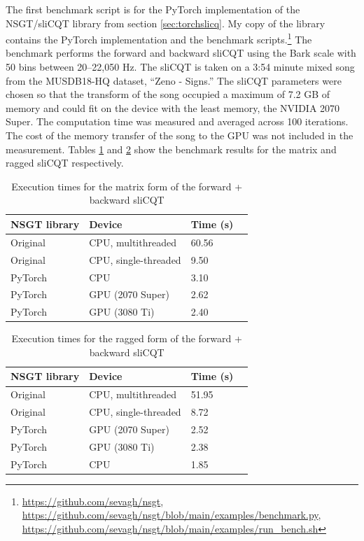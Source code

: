 \documentclass[report.tex]{subfiles}
\begin{document}
The first benchmark script is for the PyTorch implementation of the NSGT/sliCQT library from section \ref{sec:torchslicq}. My copy of the library contains the PyTorch implementation and the benchmark scripts.\footnote{\url{https://github.com/sevagh/nsgt}, \url{https://github.com/sevagh/nsgt/blob/main/examples/benchmark.py}, \url{https://github.com/sevagh/nsgt/blob/main/examples/run_bench.sh}} The benchmark performs the forward and backward sliCQT using the Bark scale with 50 bins between 20--22,050 Hz. The sliCQT is taken on a 3:54 minute mixed song from the MUSDB18-HQ dataset, ``Zeno - Signs.'' The sliCQT parameters were chosen so that the transform of the song occupied a maximum of 7.2 GB of memory and could fit on the device with the least memory, the NVIDIA 2070 Super. The computation time was measured and averaged across 100 iterations. The cost of the memory transfer of the song to the GPU was not included in the measurement. Tables \ref{table:nsgttorchresultsmatrix} and \ref{table:nsgttorchresultsragged} show the benchmark results for the matrix and ragged sliCQT respectively.

\begin{table}[ht]
	\centering
	\caption{Execution times for the matrix form of the forward + backward sliCQT}
	\label{table:nsgttorchresultsmatrix}
	\begin{tabular}{ |l|l|l|l| }
	 \hline
		NSGT library & Device & Time (s) \\
	 \hline
	 \hline
		Original & CPU, multithreaded & 60.56  \\
	 \hline
		Original & CPU, single-threaded & 9.50  \\
	 \hline
		PyTorch & CPU & 3.10  \\
	 \hline
		PyTorch & GPU (2070 Super) & 2.62 \\
	 \hline
		PyTorch & GPU (3080 Ti) &  2.40 \\
	 \hline
\end{tabular}
\end{table}

\begin{table}[ht]
	\centering
	\caption{Execution times for the ragged form of the forward + backward sliCQT}
	\label{table:nsgttorchresultsragged}
	\begin{tabular}{ |l|l|l|l| }
	 \hline
		NSGT library & Device & Time (s) \\
	 \hline
	 \hline
		Original & CPU, multithreaded & 51.95  \\
	 \hline
		Original & CPU, single-threaded & 8.72  \\
	 \hline
		PyTorch & GPU (2070 Super) & 2.52 \\
	 \hline
		PyTorch & GPU (3080 Ti) &  2.38 \\
	 \hline
		PyTorch & CPU & 1.85  \\
	 \hline
\end{tabular}
\end{table}
\end{document}
